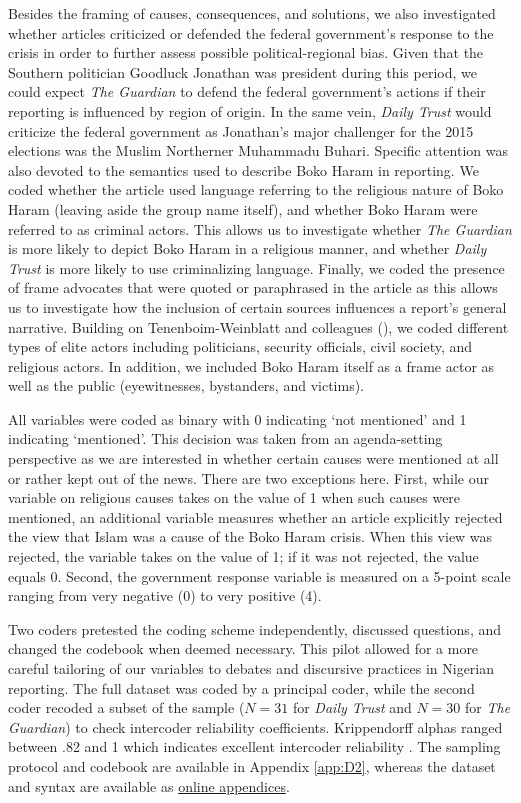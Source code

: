 Besides the framing of causes, consequences, and solutions, we also investigated whether articles criticized or defended the federal government's response to the crisis in order to further assess possible political-regional bias. Given that the Southern politician Goodluck Jonathan was president during this period, we could expect \textit{The Guardian} to defend the federal government's actions if their reporting is influenced by region of origin. In the same vein, \textit{Daily Trust} would criticize the federal government as Jonathan's major challenger for the 2015 elections was the Muslim Northerner Muhammadu Buhari. Specific attention was also devoted to the semantics used to describe Boko Haram in reporting. We coded whether the article used language referring to the religious nature of Boko Haram (leaving aside the group name itself), and whether Boko Haram were referred to as criminal actors. This allows us to investigate whether \textit{The Guardian} is more likely to depict Boko Haram in a religious manner, and whether \textit{Daily Trust} is more likely to use criminalizing language. Finally, we coded the presence of frame advocates that were quoted or paraphrased in the article as this allows us to investigate how the inclusion of certain sources influences a report's general narrative. Building on Tenenboim-Weinblatt and colleagues (\citeyear{Tenenboim-Weinblatt2016}), we coded different types of elite actors including politicians, security officials, civil society, and religious actors. In addition, we included Boko Haram itself as a frame actor as well as the public (eyewitnesses, bystanders, and victims). 


All variables were coded as binary with 0 indicating `not mentioned' and 1 indicating `mentioned'. This decision was taken from an agenda-setting perspective as we are interested in whether certain causes were mentioned at all or rather kept out of the news. There are two exceptions here. First, while our variable on religious causes takes on the value of 1 when such causes were mentioned, an additional variable measures whether an article explicitly rejected the view that Islam was a cause of the Boko Haram crisis. When this view was rejected, the variable takes on the value of 1; if it was not rejected, the value equals 0. Second, the government response variable is measured on a 5-point scale ranging from very negative (0) to very positive (4). 


Two coders pretested the coding scheme independently, discussed questions, and changed the codebook when deemed necessary. This pilot allowed for a more careful tailoring of our variables to debates and discursive practices in Nigerian reporting. The full dataset was coded by a principal coder, while the second coder recoded a subset of the sample ($N=31$ for \textit{Daily Trust} and $N=30$ for \textit{The Guardian}) to check intercoder reliability coefficients. Krippendorff alphas ranged between .82 and 1 which indicates excellent intercoder reliability \citep{Krippendorff2018}. The sampling protocol and codebook are available in Appendix \ref{app:D2}, whereas the dataset and syntax are available as \href{https://academic.oup.com/joc/article/70/4/548/5841553#supplementary-data}{online appendices}.


